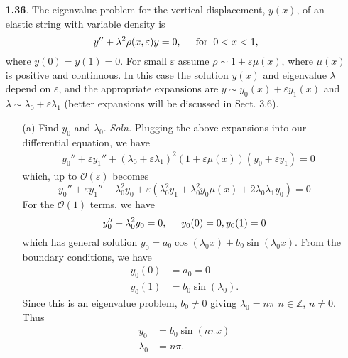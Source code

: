 \documentclass{article}
\begin{document}
\begin{itemize}
    \pagebreak

    \item[\textbf{1.36}.] The eigenvalue problem for the vertical displacement, $y(x)$, of an elastic string with variable density is
    \[y'' + \lambda^2\rho(x,\varepsilon)y = 0, \hspace{0.5cm} \text{for} \hspace{0.2cm} 0 < x < 1,\]
    where $y(0) = y(1) = 0$. For small $\varepsilon$ assume $\rho \sim 1 + \varepsilon\mu(x)$, where $\mu(x)$ is positive and continuous. In this case the solution $y(x)$ and eigenvalue $\lambda$ depend on $\varepsilon$, and the appropriate expansions are $y \sim y_0(x) + \varepsilon y_1(x)$ and $\lambda \sim \lambda_0 + \varepsilon \lambda_1$ (better expansions will be discussed in Sect. 3.6).
    \begin{itemize}
        \item[(a)] Find $y_0$ and $\lambda_0$.
        \newline\newline
        \textit{Soln.} Plugging the above expansions into our differential equation, we have
        \begin{align*}
            &y_0'' + \varepsilon y_1'' + (\lambda_0 + \varepsilon\lambda_1)^2(1 + \varepsilon\mu(x))(y_0 + \varepsilon y_1) = 0 
        \end{align*}
        which, up to $\mathcal{O}(\varepsilon)$ becomes
        \[y_0'' + \varepsilon y_1'' + \lambda_0^2y_0 + \varepsilon(\lambda_0^2y_1 + \lambda_0^2y_0\mu(x) + 2\lambda_0\lambda_1y_0) = 0\]
        For the $\mathcal{O}(1)$ terms, we have
        \[y_0'' + \lambda_0^2y_0 = 0, \hspace{0.5cm} y_0(0) = 0, y_0(1) = 0\]
        which has general solution $y_0 = a_0\cos(\lambda_0x) + b_0\sin(\lambda_0x)$. From the boundary conditions, we have 
        \begin{align*}
            y_0(0) &= a_0 = 0\\
            y_0(1) &= b_0\sin(\lambda_0).
        \end{align*}
        Since this is an eigenvalue problem, $b_0 \neq 0$ giving $\lambda_0 = n\pi$ $n \in \mathbb{Z}$, $n \neq 0$. Thus
        \begin{align*}
            y_0 &= b_0\sin(n\pi x)\\
            \lambda_0 &= n\pi.
        \end{align*}
        



\end{itemize}
\end{itemize}
\end{document}
